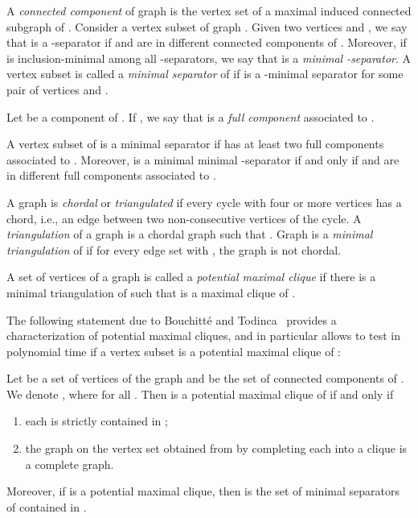 \documentclass{llncs}
\begin{document}
A \emph{connected component} of graph  is the vertex set of a maximal induced connected subgraph of . Consider a vertex subset  of graph . Given two vertices  and , we say that  is a -separator if  and  are in different connected components of . Moreover, if  is inclusion-minimal among all -separators, we say that  is a \emph{minimal -separator}. A vertex subset  is called a \emph{minimal separator} of  if  is a -minimal separator for some pair of vertices  and .

 Let  be a component of . If , we say that  is a \emph{full component} associated to . 

\begin{proposition}[folklore]\label{pr:full}
A vertex subset  of  is a minimal separator if  has at least two full components associated to . Moreover,  is a minimal minimal -separator if and only if  and  are in different full components associated to . 
\end{proposition}



A graph  is \emph{chordal} or \emph{triangulated} if every cycle with four or more vertices has a chord, i.e., an edge between two non-consecutive vertices of the cycle.
A {\em triangulation} of
a graph  is a chordal graph  such that . Graph  is a {\em minimal triangulation} of  if
 for every
edge set  with , the
graph  is not chordal.





A set of vertices  of a graph  is called a
{\em potential maximal clique} if there is a minimal triangulation
 of  such that  is a maximal clique of . 



The following statement due to Bouchitt{\'e} and Todinca~\cite{BoTo01} provides a characterization of potential maximal cliques, and in particular allows to test in polynomial time if a vertex subset  is a potential maximal clique of :


\begin{proposition}\label{pr:pmc_sep}
Let  be a set of vertices of the graph  and
   be the set of 
connected components of . We denote  , where  for all . Then
 is a potential maximal clique of  if and only if
\begin{enumerate}
\item each  is strictly contained in ;
\item the graph on the vertex set  obtained from  by
completing each  into a clique is a
complete graph.
\end{enumerate}
Moreover, if  is a potential maximal clique, then
 is  the set of minimal separators of  contained
in .
\end{proposition}
\end{document}
